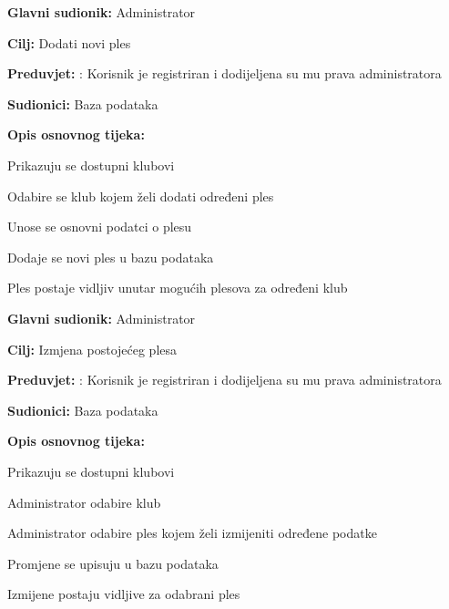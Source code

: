 					\noindent {}
					\begin{packed_item}
	
						\item \textbf{Glavni sudionik: }Administrator
						\item  \textbf{Cilj:} Dodati novi ples
						\item  \textbf{Preduvjet:} : Korisnik je registriran i dodijeljena su mu prava administratora
						\item  \textbf{Sudionici:} Baza podataka
						\item  \textbf{Opis osnovnog tijeka:						
						}
						
						\item[] \begin{packed_enum}
	
							\item Prikazuju se dostupni klubovi
							\item Odabire se klub kojem želi dodati određeni ples
							\item Unose se osnovni podatci o plesu
							\item Dodaje se novi ples u bazu podataka
							\item Ples postaje vidljiv unutar mogućih plesova za određeni klub
							
						\end{packed_enum}	
						
					\end{packed_item}
					
					\noindent \underbar{\textbf{UC7 - Izmjena plesa}}
					\begin{packed_item}
	
						\item \textbf{Glavni sudionik: }Administrator
						\item  \textbf{Cilj:} Izmjena postojećeg plesa
						\item  \textbf{Preduvjet:} : Korisnik je registriran i dodijeljena su mu prava administratora
						\item  \textbf{Sudionici:} Baza podataka
						\item  \textbf{Opis osnovnog tijeka:						
						}
						
						\item[] \begin{packed_enum}
	
							\item Prikazuju se dostupni klubovi 
							\item Administrator odabire klub
							\item Administrator odabire ples kojem želi izmijeniti određene 
podatke

							\item Promjene se upisuju u bazu podataka
							\item Izmijene postaju vidljive za odabrani ples
							
						\end{packed_enum}	
						
					\end{packed_item}
					
